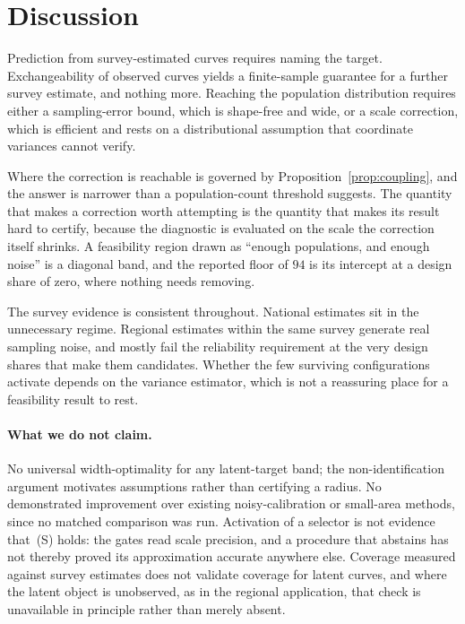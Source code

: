 \section{Discussion}\label{sec:discussion}

Prediction from survey-estimated curves requires naming the target.
Exchangeability of observed curves yields a finite-sample guarantee for a
further survey estimate, and nothing more. Reaching the population
distribution requires either a sampling-error bound, which is shape-free and
wide, or a scale correction, which is efficient and rests on a distributional
assumption that coordinate variances cannot verify.

Where the correction is reachable is governed by
Proposition~\ref{prop:coupling}, and the answer is narrower than a
population-count threshold suggests. The quantity that makes a correction worth
attempting is the quantity that makes its result hard to certify, because the
diagnostic is evaluated on the scale the correction itself shrinks. A
feasibility region drawn as ``enough populations, and enough noise'' is a
diagonal band, and the reported floor of $94$ is its intercept at a design
share of zero, where nothing needs removing.

The survey evidence is consistent throughout. National estimates sit in the
unnecessary regime. Regional estimates within the same survey generate real
sampling noise, and mostly fail the reliability requirement at the very design
shares that make them candidates. Whether the few surviving configurations
activate depends on the variance estimator, which is not a reassuring place for
a feasibility result to rest.

\paragraph{What we do not claim.} No universal width-optimality for any
latent-target band; the non-identification argument motivates assumptions
rather than certifying a radius. No demonstrated improvement over existing
noisy-calibration or small-area methods, since no matched comparison was run.
Activation of a selector is not evidence that~(S) holds: the gates read scale
precision, and a procedure that abstains has not thereby proved its
approximation accurate anywhere else. Coverage measured against survey
estimates does not validate coverage for latent curves, and where the latent
object is unobserved, as in the regional application, that check is unavailable
in principle rather than merely absent.

